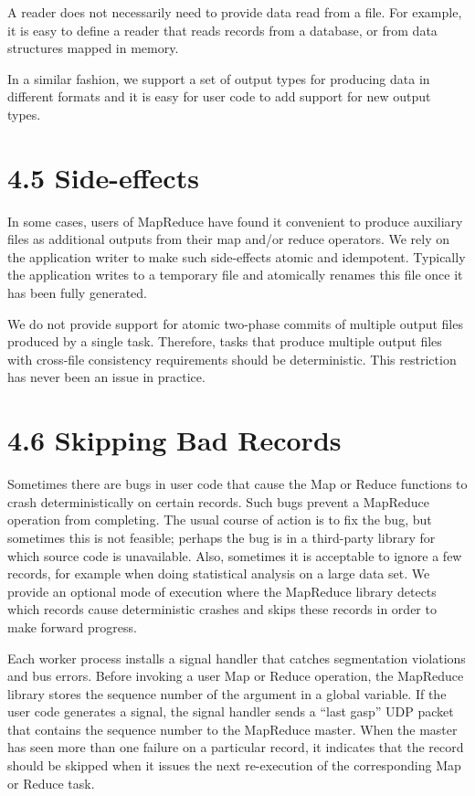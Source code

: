 \documentclass[
]{article}
\begin{document}
A reader does not necessarily need to provide data read from a file. For
example, it is easy to define a reader that reads records from a
database, or from data structures mapped in memory.

In a similar fashion, we support a set of output types for producing
data in different formats and it is easy for user code to add support
for new output types.

\section{4.5 Side-effects}\label{side-effects}

In some cases, users of MapReduce have found it convenient to produce
auxiliary files as additional outputs from their map and/or reduce
operators. We rely on the application writer to make such side-effects
atomic and idempotent. Typically the application writes to a temporary
file and atomically renames this file once it has been fully generated.

We do not provide support for atomic two-phase commits of multiple
output files produced by a single task. Therefore, tasks that produce
multiple output files with cross-file consistency requirements should be
deterministic. This restriction has never been an issue in practice.

\section{4.6 Skipping Bad Records}\label{skipping-bad-records}

Sometimes there are bugs in user code that cause the Map or Reduce
functions to crash deterministically on certain records. Such bugs
prevent a MapReduce operation from completing. The usual course of
action is to fix the bug, but sometimes this is not feasible; perhaps
the bug is in a third-party library for which source code is
unavailable. Also, sometimes it is acceptable to ignore a few records,
for example when doing statistical analysis on a large data set. We
provide an optional mode of execution where the MapReduce library
detects which records cause deterministic crashes and skips these
records in order to make forward progress.

Each worker process installs a signal handler that catches segmentation
violations and bus errors. Before invoking a user Map or Reduce
operation, the MapReduce library stores the sequence number of the
argument in a global variable. If the user code generates a signal, the
signal handler sends a ``last gasp'' UDP packet that contains the
sequence number to the MapReduce master. When the master has seen more
than one failure on a particular record, it indicates that the record
should be skipped when it issues the next re-execution of the
corresponding Map or Reduce task.
\end{document}
